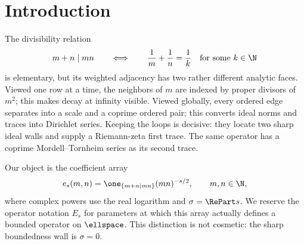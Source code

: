 \section{Introduction}
\label{sec:introduction}

The divisibility relation
\begin{equation}
  m+n\mid mn
  \qquad\Longleftrightarrow\qquad
  \frac1m+\frac1n=\frac1k\quad\text{for some }k\in\N
  \label{eq:harmonic-relation}
\end{equation}
is elementary, but its weighted adjacency has two rather different
analytic faces.  Viewed one row at a time, the neighbors of $m$ are indexed
by proper divisors of $m^2$; this makes decay at infinity visible.  Viewed
globally, every ordered edge separates into a scale and a coprime ordered
pair; this converts ideal norms and traces into Dirichlet series.  Keeping
the loops is decisive: they locate two sharp ideal walls and supply a
Riemann-zeta first trace.  The same operator has a coprime
Mordell--Tornheim series as its second trace.

Our object is the coefficient array
\begin{equation}
  e_s(m,n)=\one_{\{m+n\mid mn\}}(mn)^{-s/2},
  \qquad m,n\in\N,
  \label{eq:coefficient-array-intro}
\end{equation}
where complex powers use the real logarithm and $\sigma=\RePart s$.  We
reserve the operator notation $E_s$ for parameters at which this array
actually defines a bounded operator on $\ellspace$.  This distinction is
not cosmetic: the sharp boundedness wall is $\sigma=0$.

